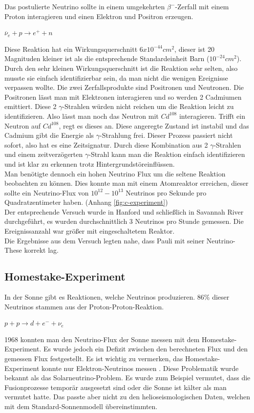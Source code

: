 Das postulierte Neutrino sollte in einem umgekehrten $\beta^{-}$-Zerfall mit einem Proton interagieren
und einen Elektron und Positron erzeugen.
\begin{center}
$\overline{\nu}_e + p \rightarrow e^+ + n$
\end{center}
Diese Reaktion hat ein Wirkungsquerschnitt $6 x 10^{-44} cm^2$, dieser ist 20 Magnituden kleiner ist als die entsprechende
Standardeinheit Barn ($10^{-24} cm^2$).
Durch den sehr kleinen Wirkungsquerschnitt ist die Reaktion sehr selten, also musste sie einfach identifizierbar
sein, da man nicht die wenigen Ereignisse verpassen wollte.
Die zwei Zerfallsprodukte sind Positronen und Neutronen. Die Positronen lässt man mit Elektronen interagieren
und so werden 2 Cadmiumen emittiert.
Diese 2 $\gamma$-Strahlen würden nicht reichen um die Reaktion leicht zu identifizieren.
Also lässt man noch das Neutron mit $Cd^{108}$ interagieren. Trifft ein Neutron auf $Cd^{108}$, regt es dieses an.
Diese angeregte Zustand ist instabil und das Cadmium gibt die Energie als $\gamma$-Strahlung frei. Dieser Prozess
passiert nicht sofort, also hat es eine Zeitsignatur.
Durch diese Kombination aus 2 $\gamma$-Strahlen und einem zeitverzögerten $\gamma$-Strahl kann man die Reaktion einfach
identifizieren und ist klar zu erkennen trotz Hintergrundstöreinflüssen. \\
Man benötigte dennoch ein hohen Neutrino Flux um die seltene Reaktion beobachten zu können. Dies konnte
man mit einem Atomreaktor erreichen, dieser sollte ein Neutrino-Flux von  $10^{12}-10^{13}$ Neutrinos
pro Sekunde pro Quadratzentimeter haben. \cite{Nave2017} (Anhang \ref{fig:c-experiment}) \\
Der entsprechende Versuch wurde in Hanford und schließlich in Savannah River durchgeführt, es wurden
durchschnittlich 3 Neutrinos pro Stunde gemessen. Die Ereignissanzahl war größer mit eingeschaltetem
Reaktor. \\
Die Ergebnisse aus dem Versuch legten nahe, dass Pauli mit seiner Neutrino-These korrekt lag.

\subsection{Homestake-Experiment}

In der Sonne gibt es Reaktionen, welche Neutrinos produzieren. 86\% dieser Neutrinos stammen aus der
Proton-Proton-Reaktion.
\begin{center}
$p + p \rightarrow d + e^- + \nu_e$
\end{center}
1968 konnten man den Neutrino-Flux der Sonne messen mit dem Homestake-Experiment.\cite{Cleveland1998}
Es wurde jedoch ein Defizit zwischen den berechneten Flux und den gemessen Flux festgestellt.
Es ist wichtig zu vermerken, das Homestake-Experiment konnte nur Elektron-Neutrinos messen .
Diese Problematik wurde bekannt als das Solarneutrino-Problem. Es wurde zum Beispiel vermutet, dass die Fusionprozesse
temporär ausgesetzt sind oder die Sonne ist kälter als man vermutet hatte. Das passte aber nicht zu den
helioseismologischen Daten, welchen mit dem Standard-Sonnenmodell übereinstimmten.

